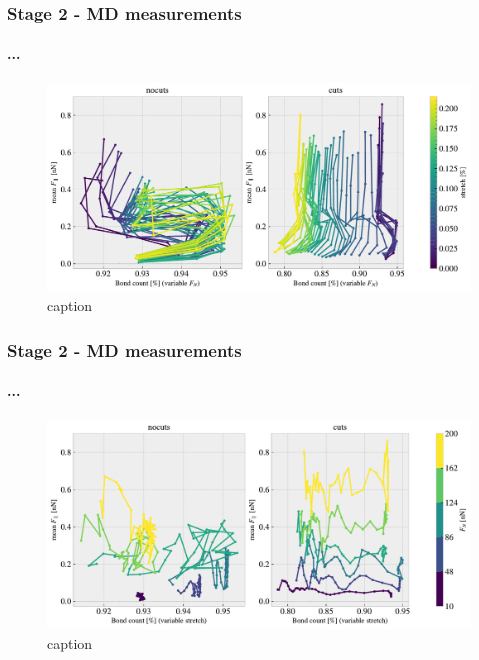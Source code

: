 \documentclass[
	10pt, %
]{beamer}
\begin{document}
\begin{frame}
	\frametitle{Stage 2 - MD measurements}
	\framesubtitle{...}
	\begin{figure}
		\includegraphics[width=\linewidth]{figures/multi5.pdf}
		\caption{caption}
	\end{figure}	
\end{frame}

\begin{frame}
	\frametitle{Stage 2 - MD measurements}
	\framesubtitle{...}
	\begin{figure}
		\includegraphics[width=\linewidth]{figures/multi6.pdf}
		\caption{caption}
	\end{figure}	
\end{frame}
\end{document}
